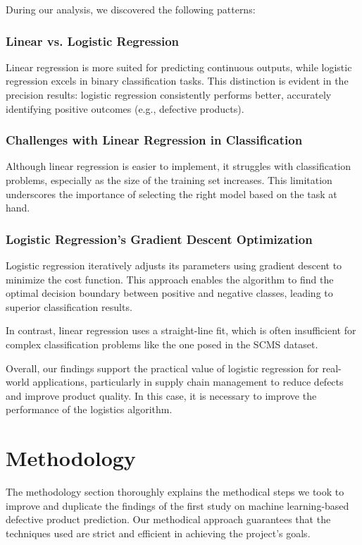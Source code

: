 \documentclass[conference]{IEEEtran}
\begin{document}
During our analysis, we discovered the following patterns:

\subsubsection{Linear vs. Logistic Regression}

Linear regression is more suited for predicting continuous outputs, while logistic regression excels in binary classification tasks. This distinction is evident in the precision results: logistic regression consistently performs better, accurately identifying positive outcomes (e.g., defective products).

\subsubsection{Challenges with Linear Regression in Classification}

Although linear regression is easier to implement, it struggles with classification problems, especially as the size of the training set increases. This limitation underscores the importance of selecting the right model based on the task at hand.

\subsubsection{Logistic Regression's Gradient Descent Optimization}

Logistic regression iteratively adjusts its parameters using gradient descent to minimize the cost function. This approach enables the algorithm to find the optimal decision boundary between positive and negative classes, leading to superior classification results.

In contrast, linear regression uses a straight-line fit, which is often insufficient for complex classification problems like the one posed in the SCMS dataset.

Overall, our findings support the practical value of logistic regression for real-world applications, particularly in supply chain management to reduce defects and improve product quality. In this case, it is necessary to improve the performance of the logistics algorithm.


\section{Methodology}
The methodology section thoroughly explains the methodical steps we took to improve and duplicate the findings of the first study on machine learning-based defective product prediction. Our methodical approach guarantees that the techniques used are strict and efficient in achieving the project's goals.
\end{document}
